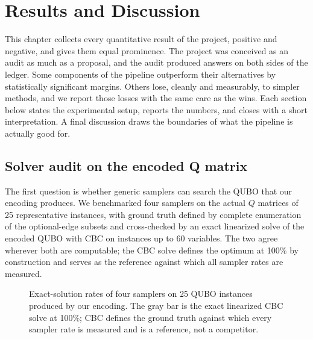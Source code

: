 \section{Results and Discussion}
\label{ch:results}

This chapter collects every quantitative result of the project, positive
and negative, and gives them equal prominence. The project was conceived
as an audit as much as a proposal, and the audit produced answers on both
sides of the ledger. Some components of the pipeline outperform their
alternatives by statistically significant margins. Others lose, cleanly
and measurably, to simpler methods, and we report those losses with the
same care as the wins. Each section below states the experimental setup,
reports the numbers, and closes with a short interpretation. A final
discussion draws the boundaries of what the pipeline is actually good
for.

\subsection{Solver audit on the encoded Q matrix}
\label{sec:res-solver-audit}

The first question is whether generic samplers can search the QUBO that
our encoding produces. We benchmarked four samplers on the actual $Q$
matrices of 25 representative instances, with ground truth defined by
complete enumeration of the optional-edge subsets and cross-checked by an
exact linearized solve of the encoded QUBO with CBC on instances up to 60
variables. The two agree wherever both are computable; the CBC solve
defines the optimum at 100\% by construction and serves as the reference
against which all sampler rates are measured.

\begin{figure}[t]
  \centering
  \caption{Exact-solution rates of four samplers on 25 QUBO instances
  produced by our encoding. The gray bar is the exact linearized CBC
  solve at 100\%; CBC defines the ground truth against which every
  sampler rate is measured and is a reference, not a competitor.}
  \label{fig:res-sampler-rates}
\end{figure}

